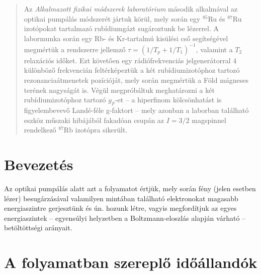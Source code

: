 \begin{abstract}
    \noindent Az \emph{Alkalmazott fizikai módszerek laboratórium} második alkalmával az optikai pumpálás módszerét jártuk körül, mely során egy $^{85}$Ru és $^{87}$Ru izotópokat tartalmazó rubídiumgázt sugároztunk be lézerrel. A labormunka során egy Rb- és Kr-tartalmú kisülési cső segítségével megmértük a rendszerre jellemző $\tau = \left( 1/T_{p} + 1/T_{1} \right)^{-1}$, valamint a $T_{2}$ relaxációs időket. Ezt követően egy rádiófrekvenciás jelgenerátorral $4$ különböző frekvencián feltérképeztük a két rubídiumizotóphoz tartozó rezonanciaátmenetek pozícióját, mely során megmértük a Föld mágneses terének nagyságát is. Végül megpróbáltuk meghatározni a két rubídiumizotóphoz tartozó $g_{F}$-et -- a hiperfinom kölcsönhatást is figyelembevevő Landé-féle g-faktort -- mely azonban a laborban található eszköz műszaki hibájából fakadóan csupán az $I=3/2$ magspinnel rendelkező $^{87}$Rb izotópra sikerült.
\end{abstract}

\begin{multicols}{2}
\section{Bevezetés}
Az optikai pumpálás alatt azt a folyamatot értjük, mely során fény (jelen esetben lézer) besugárzásával valamilyen mintában található elektronokat magasabb energiaszintre gerjesztünk és ún.  hozunk létre, vagyis megfordítjuk az egyes energiaszintek -- egyensúlyi helyzetben a Boltzmann-eloszlás alapján várható -- betöltöttségi arányait.

\section{A folyamatban szereplő időállandók}


\end{multicols}